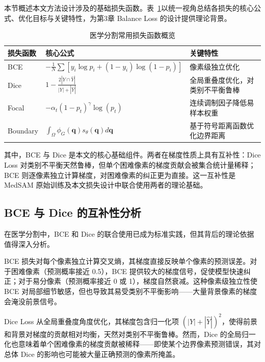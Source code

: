 本节概述本文方法设计涉及的基础损失函数。表~\ref{tab:loss_overview}以统一视角总结各损失的核心公式、优化目标与关键特性，为第3章 Balance Loss 的设计提供理论背景。

\begin{table}[htbp]
  \centering
  \caption{医学分割常用损失函数概览}
  \label{tab:loss_overview}
  \small
  \begin{tabular}{llp{5.5cm}}
    \hline
    损失函数 & 核心公式 & 关键特性 \\
    \hline
    BCE\cite{goodfellow2016deeplearning} & $-\frac{1}{N}\sum[y_i\log p_i+(1{-}y_i)\log(1{-}p_i)]$ & 像素级独立优化 \\
    Dice\cite{milletari2016vnet} & $1-\frac{2|Y\cap\hat{Y}|}{|Y|+|\hat{Y}|}$ & 全局重叠度优化，对类别不平衡鲁棒 \\
    Focal\cite{lin2017focal} & $-\alpha_t(1{-}p_t)^\gamma\log(p_t)$ & 连续调制因子降低易样本权重 \\
    Boundary\cite{kervadec2019boundary} & $\int_\Omega \phi_G(\mathbf{q})s_\theta(\mathbf{q})d\mathbf{q}$ & 基于符号距离函数优化边界距离 \\
    \hline
  \end{tabular}
\end{table}

其中，BCE 与 Dice 是本文的核心基础组件。两者在梯度性质上具有互补性：Dice Loss 对类别不平衡天然鲁棒，但单个困难像素的梯度贡献会被集合统计量稀释；BCE 则逐像素独立计算梯度，对困难像素的纠正更为直接。这一互补性是 MedSAM 原始训练及本文损失设计中联合使用两者的理论基础。

\subsection{BCE 与 Dice 的互补性分析}

在医学分割中，BCE 和 Dice 的联合使用已成为标准实践，但其背后的理论依据值得深入分析。

BCE 损失对每个像素独立计算交叉熵，其梯度直接反映单个像素的预测误差。对于困难像素（预测概率接近 0.5），BCE 提供较大的梯度信号，促使模型快速纠正；对于易分像素（预测概率接近 0 或 1），梯度自然衰减。这种像素级独立性使 BCE 对局部细节敏感，但也导致其易受类别不平衡影响——大量背景像素的梯度会淹没前景信号。

Dice Loss 从全局重叠度角度优化，其梯度包含归一化项 $(|Y|+|\hat{Y}|)^2$，使得前景和背景对梯度的贡献相对均衡，天然对类别不平衡鲁棒。然而，Dice 的全局归一化也意味着单个困难像素的梯度贡献被稀释——即使某个边界像素预测错误，其对总体 Dice 的影响也可能被大量正确预测的像素所掩盖。

